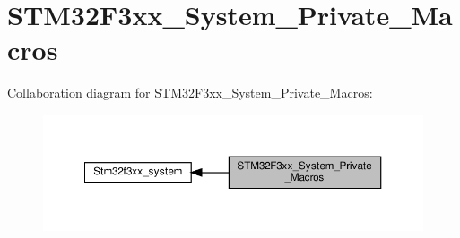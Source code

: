 \hypertarget{group__STM32F3xx__System__Private__Macros}{}\section{S\+T\+M32\+F3xx\+\_\+\+System\+\_\+\+Private\+\_\+\+Macros}
\label{group__STM32F3xx__System__Private__Macros}
Collaboration diagram for S\+T\+M32\+F3xx\+\_\+\+System\+\_\+\+Private\+\_\+\+Macros\+:\nopagebreak
\begin{figure}[H]
\begin{center}
\leavevmode
\includegraphics[width=350pt]{group__STM32F3xx__System__Private__Macros}
\end{center}
\end{figure}

